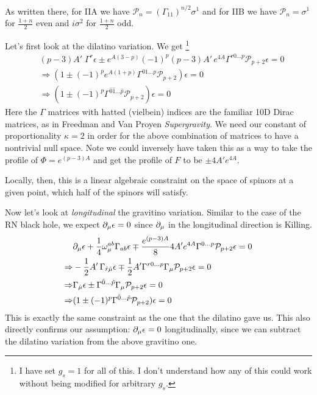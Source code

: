 \documentclass[11pt, class=article, crop=false]{standalone}
\begin{document}
\begin{enumerate}
	 As written there, for IIA we have $\mathcal P_n = (\Gamma_{11})^{n/2} \sigma^1$ and for IIB we have $\mathcal P_n = \sigma^1$ for $\frac{1+n}{2}$ even and $i \sigma^2$ for $\frac{1+n}{2}$ odd. 
	
	Let's first look at the dilatino variation. We get \footnote{I have set $g_s = 1$ for all of this. I don't understand how any of this could work without being modified for arbitrary $g_s$.}
	\[
	\begin{aligned}
		&(p-3) A' \; \Gamma^r \epsilon \pm e^{A(3-p)} (-1)^{p} (p-3) A'\, e^{4A} \Gamma^{r 0 \dots p} \mathcal P_{p+2} \epsilon = 0\\
		& \Rightarrow (1 \pm (-1)^{p} e^{A (1 + p)} \Gamma^{0 1 \dots p} \mathcal P_{p+2}) \epsilon = 0\\
		& \Rightarrow (1 \pm  (-1)^{p} \Gamma^{\hat 0 \hat 1 \dots \hat p} \mathcal P_{p+2}) \epsilon = 0
	\end{aligned}
	\]
	Here the $\Gamma$ matrices with hatted (vielbein) indices are the familiar 10D Dirac matrices, as in Freedman and Van Proyen \emph{Supergravity}. We need our constant of proportionality $\kappa=2$ in order for the above combination of matrices to have a nontrivial null space. Note we could inversely have taken this as a way to take the profile of $\Phi = e^{(p-3) A}$ and get the profile of $F$ to be  $\pm 4 A' e^{4A}$.

	Locally, then, this is a linear algebraic constraint on the space of spinors at a given point, which half of the spinors will satisfy. 
	
	Now let's look at \emph{longitudinal} the gravitino variation. Similar to the case of the RN black hole, we expect $\partial_\mu \epsilon = 0$ since $\partial_\mu$ in the longitudinal direction is Killing.
	\[
	\begin{aligned}
		& \partial_\mu \epsilon + \frac14 \omega_\mu^{ab} \Gamma_{ab} \epsilon \mp \frac{e^{(p-3)A}}{8} 4 A' e^{4 A} \Gamma^{0 \dots p} \mathcal P_{p+2} \epsilon = 0 \\
		\Rightarrow & - \frac12 A' \, \Gamma_{\hat r \hat \mu} \epsilon \mp \frac12 A' \Gamma^{r 0 \dots p} \Gamma_\mu \mathcal P_{p+2} \epsilon = 0\\
		\Rightarrow & \Gamma_{\hat \mu} \epsilon \pm \Gamma^{\hat 0 \dots \hat p} \Gamma_\mu \mathcal P_{p+2} \epsilon = 0\\
		\Rightarrow & (1 \pm (-1)^p \Gamma^{\hat 0 \dots \hat p} \mathcal P_{p+2}) \epsilon = 0
	\end{aligned}
	\]
	This is exactly the same constraint as the one that the dilatino gave us. This also directly confirms our assumption: $\partial_\mu \epsilon = 0$ longitudinally, since we can subtract the dilatino variation from the above gravitino one. 
	

\end{enumerate}
\end{document}

